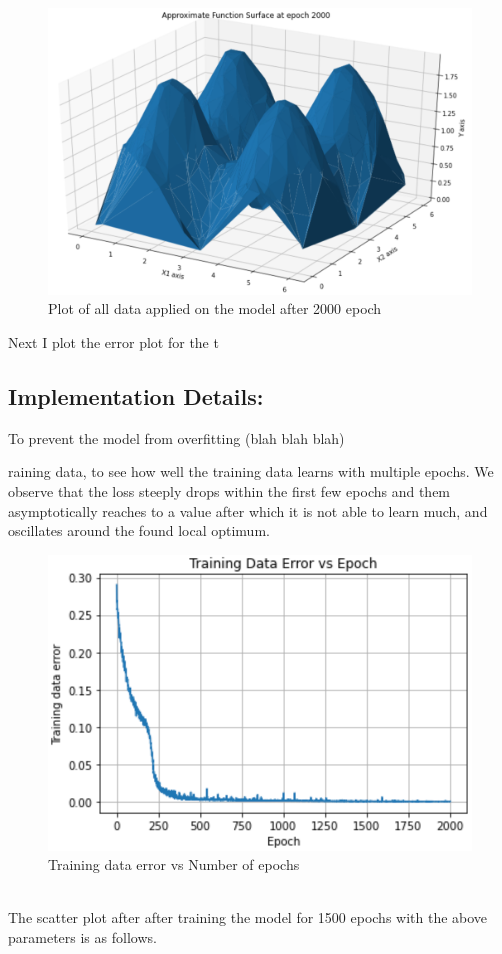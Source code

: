 \documentclass[10pt,a4paper]{article}
\begin{document}
\begin{figure}[htbp]
    \centering
    \includegraphics[width=0.8\linewidth]{Ep2000.png}
    \captionsetup{justification=centering}
    \caption{Plot of all data applied on the model after 2000 epoch}
\end{figure}
\newpage
Next I plot the error plot for the t

\subsection{Implementation Details:}

To prevent the model from overfitting (blah blah blah)


raining data, to see how well the training data learns with multiple epochs. We observe that the loss steeply drops within the first few epochs and them asymptotically reaches to a value after which it is not able to learn much, and oscillates around the found local optimum.
\begin{figure}[htbp]
    \centering
    \includegraphics[width=0.8\linewidth]{errvsep.png}
    \captionsetup{justification=centering}
    \caption{Training data error vs Number of epochs}
\end{figure}
\\
The scatter plot after after training the model for 1500 epochs with the above parameters is as follows.\\
\\
\end{document}
